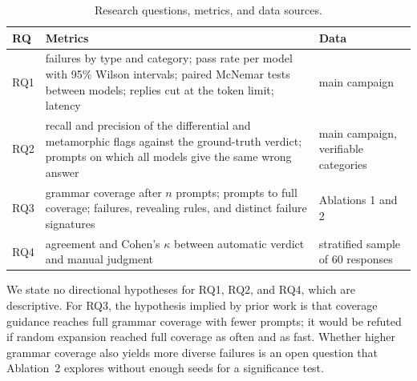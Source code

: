 \begin{table}[ht]
\centering
\caption{Research questions, metrics, and data sources.}
\label{tab:rqs}
\footnotesize\setlength{\tabcolsep}{3pt}
\begin{tabularx}{\linewidth}{@{}l X X@{}}
\toprule
RQ & Metrics & Data \\
\midrule
RQ1 & failures by type and category; pass rate per model with 95\% Wilson intervals; paired McNemar tests between models; replies cut at the token limit; latency & main campaign \\
RQ2 & recall and precision of the differential and metamorphic flags against the ground-truth verdict; prompts on which all models give the same wrong answer & main campaign, verifiable categories \\
RQ3 & grammar coverage after $n$ prompts; prompts to full coverage; failures, revealing rules, and distinct failure signatures & Ablations 1 and 2 \\
RQ4 & agreement and Cohen's $\kappa$ between automatic verdict and manual judgment & stratified sample of 60 responses \\
\bottomrule
\end{tabularx}
\end{table}

We state no directional hypotheses for RQ1, RQ2, and RQ4, which are descriptive. For RQ3, the hypothesis implied by prior work \citep{zeller2024fuzzingbook,havrikov2019kpath} is that coverage guidance reaches full grammar coverage with fewer prompts; it would be refuted if random expansion reached full coverage as often and as fast. Whether higher grammar coverage also yields more diverse failures is an open question that Ablation~2 explores without enough seeds for a significance test.
